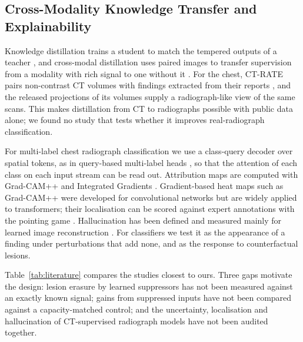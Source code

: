 \subsection{Cross-Modality Knowledge Transfer and Explainability}
\label{sec:rw-xm}
Knowledge distillation trains a student to match the tempered outputs of a teacher \cite{hinton2015distilling}, and cross-modal
distillation uses paired images to transfer supervision from a modality with rich signal to one without it \cite{gupta2016crossmodal}. For
the chest, CT-RATE pairs non-contrast CT volumes with findings extracted from their reports \cite{hamamci2026ctrate}, and the released
projections of its volumes \cite{angaitkar2026anatomy} supply a radiograph-like view of the same scans. This makes distillation from CT to
radiographs possible with public data alone; we found no study that tests whether it improves real-radiograph classification.

For multi-label chest radiograph classification we use a class-query decoder over spatial tokens, as in query-based multi-label heads
\cite{liu2021query2label,ridnik2023mldecoder}, so that the attention of each class on each input stream can be read out. Attribution maps
are computed with Grad-CAM++ \cite{chattopadhay2018gradcampp} and Integrated Gradients \cite{sundararajan2017axiomatic}. Gradient-based
heat maps such as Grad-CAM++ were developed for convolutional networks but are widely applied to transformers; their localisation can be
scored against expert annotations with the pointing game \cite{zhang2018topdown}. Hallucination has been defined and measured mainly for
learned image reconstruction \cite{bhadra2021hallucinations,tivnan2024hallucination}. For classifiers we test it as the appearance of a
finding under perturbations that add none, and as the response to counterfactual lesions.

Table~\ref{tab:literature} compares the studies closest to ours. Three gaps motivate the design: lesion erasure by learned suppressors has
not been measured against an exactly known signal; gains from suppressed inputs have not been compared against a capacity-matched
control; and the uncertainty, localisation and hallucination of CT-supervised radiograph models have not been audited together.

